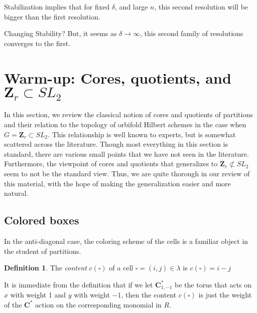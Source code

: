 \documentclass{amsart}[12pt]
\theoremstyle{definition}
\newtheorem{definition}[dummy]{Definition}
\newcommand{\Z}{\mathbf{Z}}
\newcommand{\C}{\mathbf{C}}
\begin{document}
Stabilization implies that for fixed $\delta$, and large $n$, this second resolution will be bigger than the first resolution.

Changing Stability?
But, it seems as $\delta\to\infty$, this second family of resolutions converges to the first.


\section{Warm-up: Cores, quotients, and $\Z_r\subset SL_2$}

In this section, we review the classical notion of cores and quotients of partitions and their relation to the topology of orbifold Hilbert schemes in the case when $G=\Z_r\subset SL_2$.  This relationship is well known to experts, but is somewhat scattered across the literature.  Though most everything in this section is standard, there are various small points that we have not seen in the literature.  Furthermore, the viewpoint of cores and quotients that generalizes to $\Z_r\not\subset SL_2$ seem to not be the standard view.  Thus, we are quite thorough in our review of this material, with the hope of making the generalization easier and more natural.

\subsection{Colored boxes}

In the anti-diagonal case, the coloring scheme of the cells is a familiar object in the student of partitions.

\begin{definition}
The \emph{content} $c(\square)$ of a cell $\square=(i,j)\in\lambda$ is $c(\square)=i-j$
\end{definition}


It is immediate from the definition that if we let $\C^*_{1,-1}$ be the torus that acts on $x$ with weight 1 and $y$ with weight $-1$, then the content $c(\square)$ is just the weight of the $\C^*$ action on the corresponding monomial in $R$.
\end{document}
